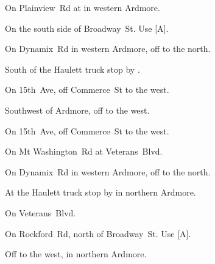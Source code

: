 
\begin{LocationList}

On Plainview~Rd at  in western Ardmore.

On the south side of Broadway~St.
Use  [A].

On Dynamix~Rd in western Ardmore, off  to the north.

South of the Haulett truck stop by  .

On 15th~Ave, off  Commerce~St to the west.

Southwest of Ardmore, off   to the west.

\Location{\RecruitmentAgency \Recruitment}
On 15th~Ave, off  Commerce~St to the west.

On Mt Washington~Rd at  Veterans~Blvd.

On Dynamix~Rd in western Ardmore, off  to the north.

At the Haulett truck stop by   in northern Ardmore.

On  Veterans~Blvd.

On Rockford~Rd, north of Broadway~St.
Use  [A].

Off   to the west, in northern Ardmore.

\end{LocationList}
